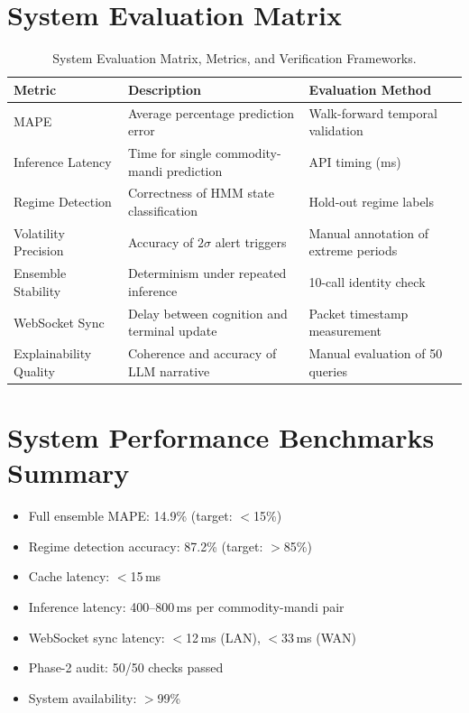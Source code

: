 \documentclass[12pt,a4paper]{report}
\theoremstyle{definition}
\theoremstyle{remark}
\begin{document}
\section{System Evaluation Matrix}

\begin{table}[htbp]
\centering
\caption{System Evaluation Matrix, Metrics, and Verification Frameworks.}
\label{tab:system_matrix}
\begin{tabular}{p{3.5cm}|p{5.5cm}|p{4.5cm}}
\hline
\textbf{Metric} & \textbf{Description} & \textbf{Evaluation Method} \\
\hline
MAPE & Average percentage prediction error & Walk-forward temporal validation \\
\hline
Inference Latency & Time for single commodity-mandi prediction & API timing (ms) \\
\hline
Regime Detection & Correctness of HMM state classification & Hold-out regime labels \\
\hline
Volatility Precision & Accuracy of $2\sigma$ alert triggers & Manual annotation of extreme periods \\
\hline
Ensemble Stability & Determinism under repeated inference & 10-call identity check \\
\hline
WebSocket Sync & Delay between cognition and terminal update & Packet timestamp measurement \\
\hline
Explainability Quality & Coherence and accuracy of LLM narrative & Manual evaluation of 50 queries \\
\hline
\end{tabular}
\end{table}

\section{System Performance Benchmarks Summary}

\begin{itemize}
    \item Full ensemble MAPE: 14.9\% (target: $<$15\%)
    \item Regime detection accuracy: 87.2\% (target: $>$85\%)
    \item Cache latency: $<$15\,ms
    \item Inference latency: 400--800\,ms per commodity-mandi pair
    \item WebSocket sync latency: $<$12\,ms (LAN), $<$33\,ms (WAN)
    \item Phase-2 audit: 50/50 checks passed
    \item System availability: $>$99\%
\end{itemize}
\end{document}
